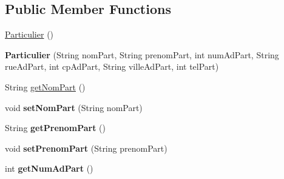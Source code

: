 \subsection*{Public Member Functions}
\begin{DoxyCompactItemize}
\item 
\hyperlink{classcom_1_1ecetech_1_1bti4_1_1itproject_1_1classified_1_1beans_1_1_particulier_ac4f79bbb0c29d5d8a9711509464d0f68}{Particulier} ()
\item 
{\bfseries Particulier} (String nom\+Part, String prenom\+Part, int num\+Ad\+Part, String rue\+Ad\+Part, int cp\+Ad\+Part, String ville\+Ad\+Part, int tel\+Part)\hypertarget{classcom_1_1ecetech_1_1bti4_1_1itproject_1_1classified_1_1beans_1_1_particulier_a8ed9662c72a3880c7d8fcb581d8ec4fb}{}\label{classcom_1_1ecetech_1_1bti4_1_1itproject_1_1classified_1_1beans_1_1_particulier_a8ed9662c72a3880c7d8fcb581d8ec4fb}

\item 
String \hyperlink{classcom_1_1ecetech_1_1bti4_1_1itproject_1_1classified_1_1beans_1_1_particulier_a34d82b783f84fe9fe06cd96f4ab0a80b}{get\+Nom\+Part} ()
\item 
void {\bfseries set\+Nom\+Part} (String nom\+Part)\hypertarget{classcom_1_1ecetech_1_1bti4_1_1itproject_1_1classified_1_1beans_1_1_particulier_a5a5605f2236beb96e21b4eec29e4eef9}{}\label{classcom_1_1ecetech_1_1bti4_1_1itproject_1_1classified_1_1beans_1_1_particulier_a5a5605f2236beb96e21b4eec29e4eef9}

\item 
String {\bfseries get\+Prenom\+Part} ()\hypertarget{classcom_1_1ecetech_1_1bti4_1_1itproject_1_1classified_1_1beans_1_1_particulier_aba8c676696237418160c042621bea09e}{}\label{classcom_1_1ecetech_1_1bti4_1_1itproject_1_1classified_1_1beans_1_1_particulier_aba8c676696237418160c042621bea09e}

\item 
void {\bfseries set\+Prenom\+Part} (String prenom\+Part)\hypertarget{classcom_1_1ecetech_1_1bti4_1_1itproject_1_1classified_1_1beans_1_1_particulier_a5bf2e8ad1237eff45a6a7d90a69bd099}{}\label{classcom_1_1ecetech_1_1bti4_1_1itproject_1_1classified_1_1beans_1_1_particulier_a5bf2e8ad1237eff45a6a7d90a69bd099}

\item 
int {\bfseries get\+Num\+Ad\+Part} ()\hypertarget{classcom_1_1ecetech_1_1bti4_1_1itproject_1_1classified_1_1beans_1_1_particulier_ada69990d906d44147eb532df67806ca4}{}\label{classcom_1_1ecetech_1_1bti4_1_1itproject_1_1classified_1_1beans_1_1_particulier_ada69990d906d44147eb532df67806ca4}


\end{DoxyCompactItemize}
